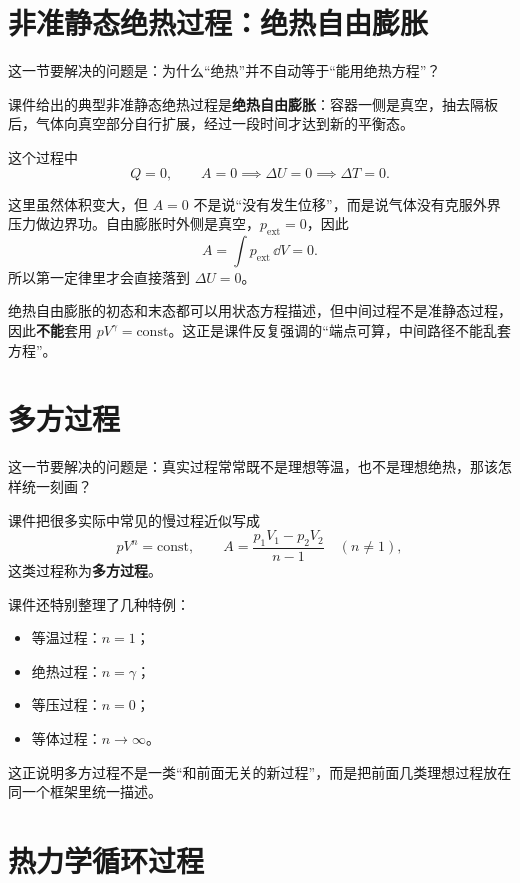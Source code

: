 \documentclass[lang=cn,11pt]{elegantbook}
\begin{document}
\section{非准静态绝热过程：绝热自由膨胀}

这一节要解决的问题是：为什么“绝热”并不自动等于“能用绝热方程”？

课件给出的典型非准静态绝热过程是\textbf{绝热自由膨胀}：容器一侧是真空，抽去隔板后，气体向真空部分自行扩展，经过一段时间才达到新的平衡态。

这个过程中
\[
Q=0,\qquad A=0
\implies \Delta U=0
\implies \Delta T=0.
\]

\begin{note}
这里虽然体积变大，但 \(A=0\) 不是说“没有发生位移”，而是说气体没有克服外界压力做边界功。自由膨胀时外侧是真空，\(p_{\text{ext}}=0\)，因此
\[
A=\int p_{\text{ext}}\,\dd V=0.
\]
所以第一定律里才会直接落到 \(\Delta U=0\)。
\end{note}

\begin{remark}
绝热自由膨胀的初态和末态都可以用状态方程描述，但中间过程不是准静态过程，因此\textbf{不能}套用 \(pV^\gamma=\text{const}\)。这正是课件反复强调的“端点可算，中间路径不能乱套方程”。
\end{remark}

\section{多方过程}

这一节要解决的问题是：真实过程常常既不是理想等温，也不是理想绝热，那该怎样统一刻画？

课件把很多实际中常见的慢过程近似写成
\[
pV^n=\text{const},\qquad
A=\frac{p_1V_1-p_2V_2}{n-1}\quad (n\neq1),
\]
这类过程称为\textbf{多方过程}。

课件还特别整理了几种特例：
\begin{itemize}
  \item 等温过程：\(n=1\)；
  \item 绝热过程：\(n=\gamma\)；
  \item 等压过程：\(n=0\)；
  \item 等体过程：\(n\to\infty\)。
\end{itemize}

\begin{note}
这正说明多方过程不是一类“和前面无关的新过程”，而是把前面几类理想过程放在同一个框架里统一描述。
\end{note}

\section{热力学循环过程}
\end{document}
